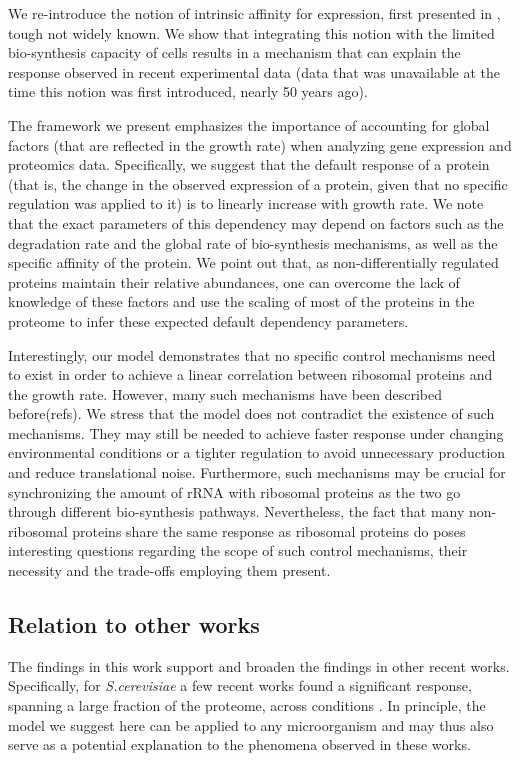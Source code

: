 \documentclass[notitlepage]{article}
\begin{document}
We re-introduce the notion of intrinsic affinity for expression, first presented in \parencite{Maaloe1969}, tough not widely known.
We show that integrating this notion with the limited bio-synthesis capacity of cells results in a mechanism that can explain the response observed in recent experimental data (data that was unavailable at the time this notion was first introduced, nearly 50 years ago).

The framework we present emphasizes the importance of accounting for global factors (that are reflected in the growth rate) when analyzing gene expression and proteomics data.
Specifically, we suggest that the default response of a protein (that is, the change in the observed expression of a protein, given that no specific regulation was applied to it) is to linearly increase with growth rate.
We note that the exact parameters of this dependency may depend on factors such as the degradation rate and the global rate of bio-synthesis mechanisms, as well as the specific affinity of the protein.
We point out that, as non-differentially regulated proteins maintain their relative abundances, one can overcome the lack of knowledge of these factors and use the scaling of most of the proteins in the proteome to infer these expected default dependency parameters.

Interestingly, our model demonstrates that no specific control mechanisms need to exist in order to achieve a linear correlation between ribosomal proteins and the growth rate.
However, many such mechanisms have been described before(refs).
We stress that the model does not contradict the existence of such mechanisms.
They may still be needed to achieve faster response under changing environmental conditions or a tighter regulation to avoid unnecessary production and reduce translational noise.
Furthermore, such mechanisms may be crucial for synchronizing the amount of rRNA with ribosomal proteins as the two go through different bio-synthesis pathways.
Nevertheless, the fact that many non-ribosomal proteins share the same response as ribosomal proteins do poses interesting questions regarding the scope of such control mechanisms, their necessity and the trade-offs employing them present.

\subsection{Relation to other works}
The findings in this work support and broaden the findings in other recent works.
Specifically, for \emph{S.cerevisiae} a few recent works found a significant response, spanning a large fraction of the proteome, across conditions \parencite{Keren2013a, Gasch2000, Brauer2008a}.
In principle, the model we suggest here can be applied to any microorganism and may thus also serve as a potential explanation to the phenomena observed in these works.
\end{document}
